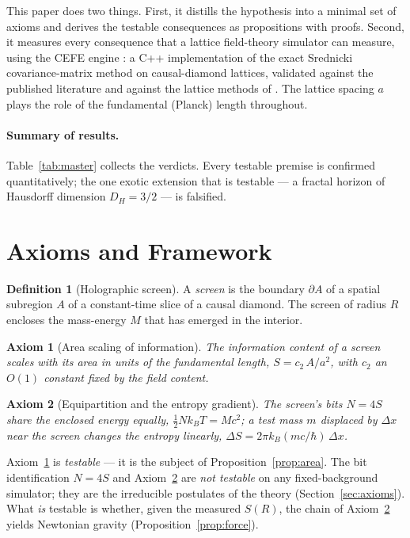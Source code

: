 \documentclass[11pt,a4paper]{article}
\newtheorem{axiom}{Axiom}
\theoremstyle{definition}
\newtheorem{definition}{Definition}
\theoremstyle{remark}
\begin{document}
This paper does two things. First, it distills the hypothesis into a minimal
set of axioms and derives the testable consequences as propositions with
proofs. Second, it measures every consequence that a lattice field-theory
simulator can measure, using the CEFE engine \cite{CEFE}: a C++ implementation
of the exact Srednicki covariance-matrix method on causal-diamond lattices,
validated against the published literature \cite{Srednicki1993,Bombelli1986}
and against the lattice methods of \cite{Gupta1998,Lepage2005}. The lattice
spacing $a$ plays the role of the fundamental (Planck) length throughout.

\paragraph{Summary of results.}
Table~\ref{tab:master} collects the verdicts. Every testable premise is
confirmed quantitatively; the one exotic extension that is testable --- a
fractal horizon of Hausdorff dimension $D_H = 3/2$ --- is falsified.

\section{Axioms and Framework}

\begin{definition}[Holographic screen]
A \emph{screen} is the boundary $\partial A$ of a spatial subregion $A$ of a
constant-time slice of a causal diamond. The screen of radius $R$ encloses the
mass-energy $M$ that has emerged in the interior.
\end{definition}

\begin{axiom}[Area scaling of information]
\label{ax:area}
The information content of a screen scales with its area in units of the
fundamental length, $S = c_2\, A/a^2$, with $c_2$ an $O(1)$ constant fixed by
the field content.
\end{axiom}

\begin{axiom}[Equipartition and the entropy gradient]
\label{ax:verlinde}
The screen's bits $N = 4S$ share the enclosed energy equally,
$\tfrac12 N k_B T = Mc^2$; a test mass $m$ displaced by $\Delta x$ near the
screen changes the entropy linearly, $\Delta S = 2\pi k_B (mc/\hbar)\,\Delta x$.
\end{axiom}

Axiom~\ref{ax:area} is \emph{testable} --- it is the subject of
Proposition~\ref{prop:area}. The bit identification $N = 4S$ and
Axiom~\ref{ax:verlinde} are \emph{not testable} on any fixed-background
simulator; they are the irreducible postulates of the theory
(Section~\ref{sec:axioms}). What \emph{is} testable is whether, given the
measured $S(R)$, the chain of Axiom~\ref{ax:verlinde} yields Newtonian gravity
(Proposition~\ref{prop:force}).
\end{document}

